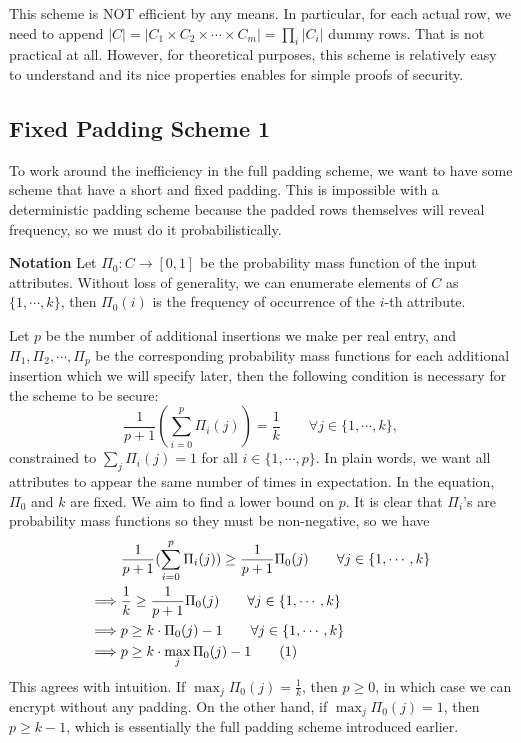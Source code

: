 \documentclass[10pt]{book}
\newcommand\numberthis{\addtocounter{equation}{1}\tag{\theequation}}
\begin{document}
This scheme is NOT efficient by any means. In particular, for each actual row, we need to append $|C| = |C_1 \times C_2 \times \cdots \times C_m| = \prod_i |C_i|$ dummy rows. That is not practical at all. However, for theoretical purposes, this scheme is relatively easy to understand and its nice properties enables for simple proofs of security.


\subsection{Fixed Padding Scheme 1}
To work around the inefficiency in the full padding scheme, we want to have some scheme that have a short and fixed padding. This is impossible with a deterministic padding scheme because the padded rows themselves will reveal frequency, so we must do it probabilistically.

\textbf{Notation} Let $\Pi_0: C \rightarrow [0,1]$ be the probability mass function of the input attributes. Without loss of generality, we can enumerate elements of $C$ as $\{1,\cdots,k\}$, then $\Pi_0(i)$ is the frequency of occurrence of the $i$-th attribute.

Let $p$ be the number of additional insertions we make per real entry, and $\Pi_1, \Pi_2, \cdots, \Pi_p$ be the corresponding probability mass functions for each additional insertion which we will specify later, then the following condition is necessary for the scheme to be secure:
\begin{equation}
	\frac{1}{p+1} (\sum_{i=0}^{p} \Pi_i(j)) = \frac{1}{k} \qquad \forall j \in \{1, \cdots, k\}, \label{first equation}
\end{equation}
constrained to $\sum_{j} \Pi_i(j) = 1$ for all $i \in \{1, \cdots, p\}$. In plain words, we want all attributes to appear the same number of times in expectation. In the equation, $\Pi_0$ and $k$ are fixed. We aim to find a lower bound on $p$. It is clear that $\Pi_i$'s are probability mass functions so they must be non-negative, so we have
\begin{align*}
				& \frac{1}{p+1} (\sum_{i=0}^{p} \Pi_i(j)) \geq \frac{1}{p+1} \Pi_0(j) \qquad \forall j \in \{1, \cdots, k\}	\\
	\implies	& \frac{1}{k} \geq \frac{1}{p+1} \Pi_0(j) \qquad \forall j \in \{1, \cdots, k\}	\\
	\implies 	& p \geq k \cdot \Pi_0(j) - 1 \qquad \forall j \in \{1, \cdots, k\}	\\
	\implies	& p \geq k \cdot \max_{j}{\Pi_0(j)} - 1 \numberthis \label{lb on p}
\end{align*}
This agrees with intuition. If $\max_{j}{\Pi_0(j)} = \frac{1}{k}$, then $p \geq 0$, in which case we can encrypt without any padding. On the other hand, if $\max_{j}{\Pi_0(j)} = 1$, then $p \geq k - 1$, which is essentially the full padding scheme introduced earlier.
\end{document}
